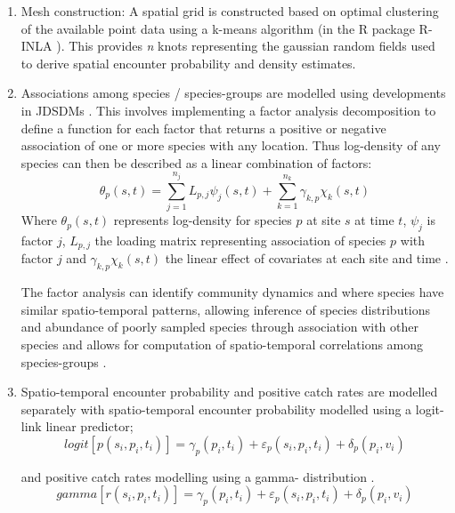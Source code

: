 \documentclass[11pt]{article}
\begin{document}
\begin{enumerate}
	\item Mesh construction: A spatial grid is constructed based on optimal
		clustering of the available point data using a k-means
		algorithm (in the R package R-INLA \cite{Lindgren2015}). This
		provides \textit{n} knots representing the gaussian random
		fields used to derive spatial encounter probability and density
		estimates.

	\item  Associations among species / species-groups are modelled using
		developments in JDSDMs \cite{Thorson2017}. This involves
		implementing a factor analysis decomposition to define a
		function for each factor that returns a positive or negative
		association of one or more species with any location. Thus
		log-density of any species can then be described as a linear
		combination of factors:
		\begin{equation}
			\theta_{p}(s,t) = \sum_{j=1}^{n_{j}}
			L_{p,j}\psi_{j}(s,t) +\sum_{k=1}^{n_{k}}
			\gamma_{k,p}\chi_{k}(s,t)
		\end{equation}
		Where $\theta_{p}(s,t)$ represents log-density for species $p$
		at site $s$ at time $t$, $\psi_{j}$ is factor $j$, $L_{p,j}$
		the loading matrix representing association of species $p$ with
		factor $j$ and $\gamma_{k,p}\chi_{k}(s,t)$ the linear effect of
		covariates at each site and time \cite{Thorson2016b}. 

		The factor analysis can identify community dynamics and where
		species have similar spatio-temporal patterns, allowing
		inference of species distributions and abundance of poorly
		sampled species through association with other species and
		allows for computation of spatio-temporal correlations among
		species-groups \cite{Thorson2016b}.

	\item Spatio-temporal encounter probability and positive catch rates
		are modelled separately with spatio-temporal encounter
		probability modelled using a logit-link linear predictor;
		\begin{equation}
			logit[p(s_{i},p_{i},t_{i})] = \gamma_{p}(p_{i},t_{i}) +
			\varepsilon_{p}(s_{i},p_{i},t_{i}) + \delta_{p}(p_{i},
			v_{i})
		\end{equation}

		
		and positive catch rates modelling using a gamma- distribution
		\cite{Thorson2015a}.  
		\begin{equation}
			gamma[r(s_{i},p_{i},t_{i})] = \gamma_{p}(p_{i},t_{i}) +
			\varepsilon_{p}(s_{i},p_{i},t_{i}) + \delta_{p}(p_{i},
			v_{i})
		\end{equation}


\end{enumerate}
\end{document}
